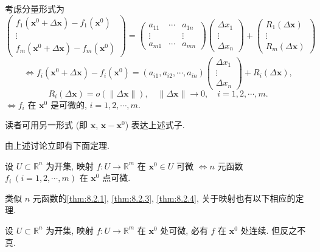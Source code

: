 考虑分量形式为
\[
  \begin{pmatrix} f_{1}(\boldsymbol{x}^{0} + \Delta\boldsymbol{x}) - f_{1}(\boldsymbol{x}^{0}) \\ \vdots \\ f_{m}(\boldsymbol{x}^{0} + \Delta\boldsymbol{x}) - f_{m}(\boldsymbol{x}^{0}) \end{pmatrix}
  = \begin{pmatrix} a_{11} & \cdots & a_{1n} \\ \vdots & & \vdots \\ a_{m1} & \cdots & a_{mn} \end{pmatrix}
    \begin{pmatrix} \Delta x_{1} \\ \vdots \\ \Delta x_{n} \end{pmatrix}
  + \begin{pmatrix} R_{1}(\Delta\boldsymbol{x}) \\ \vdots \\ R_{m}(\Delta\boldsymbol{x}) \end{pmatrix}
\]
\[
  \Leftrightarrow f_{i}(\boldsymbol{x}^{0} + \Delta\boldsymbol{x}) - f_{i}(\boldsymbol{x}^{0}) = (a_{i1}, a_{i2}, \cdots, a_{in})\begin{pmatrix} \Delta x_{1} \\ \vdots \\ \Delta x_{n} \end{pmatrix} + R_{i}(\Delta\boldsymbol{x}),
\]
\[
  R_{i}(\Delta\boldsymbol{x}) = o(\|\Delta\boldsymbol{x}\|), \quad \|\Delta\boldsymbol{x}\| \to 0, \quad i = 1, 2, \cdots, m.
\]
$\Leftrightarrow f_{i}$ 在 $\boldsymbol{x}^{0}$ 是可微的, $i = 1, 2, \cdots, m$.

读者可用另一形式 (即 $\boldsymbol{x}$, $\boldsymbol{x} - \boldsymbol{x}^{0}$) 表达上述式子.

由上述讨论立即有下面定理.

\begin{theorem}\label{thm:8.2.5}
设 $U \subset \mathbb{R}^{n}$ 为开集, 映射 $f: U \to \mathbb{R}^{m}$ 在 $\boldsymbol{x}^{0} \in U$ 可微 $\Leftrightarrow n$ 元函数 $f_{i}\ (i = 1, 2, \cdots, m)$ 在 $\boldsymbol{x}^{0}$ 点可微.
\end{theorem}

类似 $n$ 元函数的\cref{thm:8.2.1}, \cref{thm:8.2.3}, \cref{thm:8.2.4}, 关于映射也有以下相应的定理.

\setcounter{theorem}{1}
\begin{theoremp}\label{thm:8.2.1p}
设 $U \subset \mathbb{R}^{n}$ 为开集, 映射 $f: U \to \mathbb{R}^{m}$ 在 $\boldsymbol{x}^{0}$ 处可微, 必有 $f$ 在 $\boldsymbol{x}^{0}$ 处连续. 但反之不真.
\end{theoremp}

